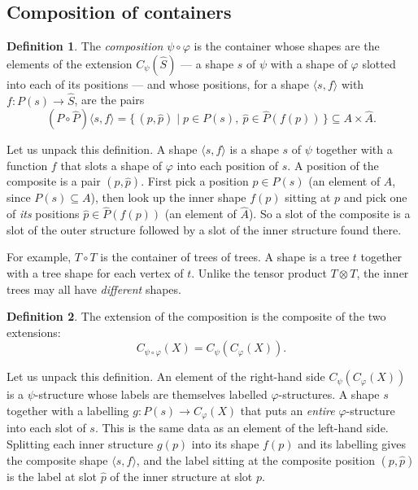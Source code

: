 \documentclass[11pt, a4paper]{article}
\theoremstyle{definition}
\newtheorem{definition}{Definition}[section]
\theoremstyle{plain}
\begin{document}
\subsection{Composition of containers}

\noindent\colorbox{gray!15}{\parbox{\dimexpr\linewidth-2\fboxsep}{%
\begin{definition}\label{def:composition}
The \emph{composition} $\psi \circ \varphi$ is the container whose
shapes are the elements of the extension $C_\psi(\hat{S})$ --- a shape
$s$ of $\psi$ with a shape of $\varphi$ slotted into each of its
positions --- and whose positions, for a shape $\langle s, f \rangle$
with $f : P(s) \to \hat{S}$, are the pairs
\[
  (P \circ \hat{P})\langle s, f \rangle
  = \{\, (p, \hat{p}) \mid p \in P(s),\ \hat{p} \in \hat{P}(f(p)) \,\}
  \subseteq A \times \hat{A}.
\]
\end{definition}%
}}

\medskip

\noindent
Let us unpack this definition.  A shape $\langle s, f \rangle$ is a
shape $s$ of $\psi$ together with a function $f$ that slots a shape of
$\varphi$ into each position of $s$.  A position of the composite is
a pair $(p, \hat{p})$.  First pick a position $p \in P(s)$ (an element of
$A$, since $P(s) \subseteq A$), then look up the inner shape $f(p)$
sitting at $p$ and pick one of \emph{its} positions
$\hat{p} \in \hat{P}(f(p))$ (an element of $\hat{A}$).  So a slot of the
composite is a slot of the outer structure followed by a slot of the
inner structure found there.

\medskip

\noindent
For example, $T \circ T$ is the container of trees of trees.  A shape is
a tree $t$ together with a tree shape for each vertex of $t$.
Unlike the tensor product $T \otimes T$, the inner trees may all have
\emph{different} shapes.

\medskip

\noindent\colorbox{gray!15}{\parbox{\dimexpr\linewidth-2\fboxsep}{%
\begin{definition}\label{def:composition-extension}
The extension of the composition is the composite of the two extensions:
\[
  C_{\psi \circ \varphi}(X) = C_\psi(C_{\varphi}(X)).
\]
\end{definition}%
}}

\medskip

\noindent
Let us unpack this definition.  An element of the right-hand side
$C_\psi(C_{\varphi}(X))$ is a $\psi$-structure whose labels are
themselves labelled $\varphi$-structures.  A shape $s$ together with a
labelling $g : P(s) \to C_{\varphi}(X)$ that puts an \emph{entire}
$\varphi$-structure into each slot of $s$.  This is the same data as
an element of the left-hand side.  Splitting each inner structure $g(p)$
into its shape $f(p)$ and its labelling gives the composite shape
$\langle s, f \rangle$, and the label sitting at the composite position
$(p, \hat{p})$ is the label at slot $\hat{p}$ of the inner structure at
slot $p$.
\end{document}

